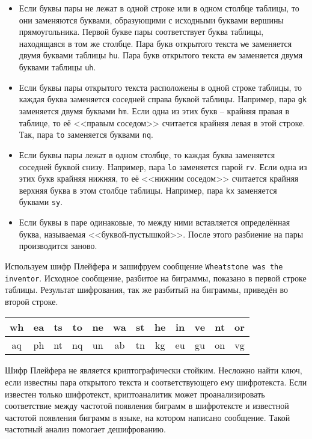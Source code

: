 \begin{itemize}
    \item Если буквы пары не лежат в одной строке или в одном столбце таблицы, то они заменяются буквами, образующими с исходными буквами вершины прямоугольника. Первой букве пары соответствует буква таблицы, находящаяся в том же столбце. Пара букв открытого текста \texttt{we} заменяется двумя буквами таблицы \texttt{hu}. Пара букв открытого текста \texttt{ew} заменяется двумя буквами таблицы \texttt{uh}.
    \item Если буквы пары открытого текста расположены в одной строке таблицы, то каждая буква заменяется соседней справа буквой таблицы. Например, пара \texttt{gk} заменяется двумя буквами \texttt{hm}. Если одна из этих букв -- крайняя правая в таблице, то её <<правым соседом>> считается крайняя левая в этой строке. Так, пара \texttt{to} заменяется буквами \texttt{nq}.
    \item Если буквы пары лежат в одном столбце, то каждая буква заменяется соседней буквой снизу. Например, пара \texttt{lo} заменяется парой \texttt{rv}. Если одна из этих букв крайняя нижняя, то её <<нижним соседом>> считается крайняя верхняя буква в этом столбце таблицы. Например, пара \texttt{kx} заменяется буквами \texttt{sy}.
    \item Если буквы в паре одинаковые, то между ними вставляется определённая буква, называемая <<буквой-пустышкой>>. После этого разбиение на пары производится заново.
\end{itemize}

\example
Используем шифр Плейфера и зашифруем сообщение \texttt{Wheatstone was the inventor}. Исходное сообщение, разбитое на биграммы, показано в первой строке таблицы. Результат шифрования, так же разбитый на биграммы, приведён во второй строке.
\begin{center} \begin{tabular}{|*{12}c|}
    \hline
    wh & ea & ts & to & ne & wa & st & he & in & ve & nt & or \\
    \hline
    aq & ph & nt & nq & un & ab & tn & kg & eu & gu & on & vg \\
    \hline
\end{tabular} \end{center}
\exampleend

Шифр Плейфера не является криптографически стойким. Несложно найти ключ, если известны пара открытого текста и соответствующего ему шифротекста. Если известен только шифротекст, криптоаналитик может проанализировать соответствие между частотой появления биграмм в шифротексте и известной частотой появления биграмм в языке, на котором написано сообщение. Такой частотный анализ помогает дешифрованию.
